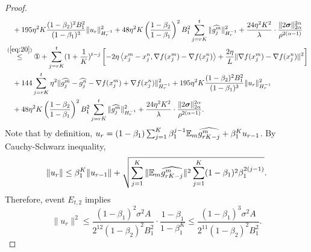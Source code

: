 \documentclass{article} %
\numberwithin{equation}{section}
\newcommand{\cirone}{\text{\ding{172}}}
\renewcommand{\eqref}[1]{(\ref{#1})}
\begin{document}
\begin{proof}
\begin{equation}
\begin{aligned}
            &\quad + 195\eta^2K\frac{(1-\beta_2)^2B_1^2}{(1-\beta_1)^3}\|u_r\|_{H_r^{-1}}^2
            +48\eta^2K\left(\frac{1-\beta_2}{1-\beta_1}\right)^2B_1^2\sum_{j=rK}^{t}\|\widehat{g_j^m}\|_{H_r^{-1}}^2 + \frac{24\eta^2K^2}{\lambda}\cdot \frac{\|2\boldsymbol{\sigma}\|_{2\alpha}^{2\alpha}}{\rho^{2(\alpha-1)}} \\
            &\overset{\eqref{eq:20}}{\leq} \cirone + \sum_{j=rK}^{t} (1+\frac{1}{K})^{t-j}\left[- 2\eta \left\langle x_j^m-x_j^n, \nabla f(x_j^m)-\nabla f(x_j^n)\right\rangle + \frac{2\eta}{L} \|\nabla f(x_j^m)-\nabla f(x_j^n)\|^2\right] \\
            &\quad + 144\sum_{j=rK}^{t}\eta^2\|\widehat{g_j^m}-\widehat{g_j^n}-\nabla f(x_j^m)+\nabla f(x_j^n)\|_{H_r^{-1}}^2 + 195\eta^2K\frac{(1-\beta_2)^2B_1^2}{(1-\beta_1)^3}\|u_r\|_{H_r^{-1}}^2\\
            &\quad +48\eta^2K\left(\frac{1-\beta_2}{1-\beta_1}\right)^2B_1^2\sum_{j=rK}^{t}\|\widehat{g_j^m}\|_{H_r^{-1}}^2 + \frac{24\eta^2K^2}{\lambda}\cdot \frac{\|2\boldsymbol{\sigma}\|_{2\alpha}^{2\alpha}}{\rho^{2(\alpha-1)}}.
        \end{aligned}
    \end{equation}
    Note that by definition, $u_r=(1-\beta_1)\sum_{j=1}^{K}\beta_1^{j-1}\mathbb{E}_m \widehat{g_{rK-j}^m}+\beta_1^Ku_{r-1}$.
    By Cauchy-Schwarz inequality,
    \begin{equation}
        \|u_r\|\leq \beta_1^K\|u_{r-1}\|+\sqrt{\sum_{j=1}^K\|\mathbb{E}_m \widehat{g_{rK-j}^m}\|^2\sum_{j=1}^K(1-\beta_1)^2\beta_1^{2(j-1)}}.
    \end{equation}
    Therefore, event $E_{t,2}$ implies 
    \begin{equation}\label{eq:33}
        \|u_r\|^2\leq \frac{(1-\beta_1)^2\sigma^2A}{2^{12}(1-\beta_2)^2B_1^2} \cdot \frac{1-\beta_1}{1-\beta_1^K}\leq \frac{(1-\beta_1)^3\sigma^2A}{2^{11}(1-\beta_2)^2B_1^2}.
    \end{equation}
    

\end{proof}
\end{document}
